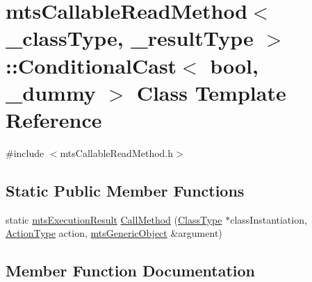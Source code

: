 \hypertarget{classmts_callable_read_method_1_1_conditional_cast}{}\section{mts\+Callable\+Read\+Method$<$ \+\_\+class\+Type, \+\_\+result\+Type $>$\+:\+:Conditional\+Cast$<$ bool, \+\_\+dummy $>$ Class Template Reference}
\label{classmts_callable_read_method_1_1_conditional_cast}


{\ttfamily \#include $<$mts\+Callable\+Read\+Method.\+h$>$}

\subsection*{Static Public Member Functions}
\begin{DoxyCompactItemize}
\item 
static \hyperlink{classmts_execution_result}{mts\+Execution\+Result} \hyperlink{classmts_callable_read_method_1_1_conditional_cast_aeb1f85e7fc92ca13e6c54c5d16d96399}{Call\+Method} (\hyperlink{classmts_callable_read_method_a44650138085a29d60a4f3cb3616abbbf}{Class\+Type} $\ast$class\+Instantiation, \hyperlink{classmts_callable_read_method_a9e05546d6f486e77f1df0c2b079dd7e1}{Action\+Type} action, \hyperlink{classmts_generic_object}{mts\+Generic\+Object} \&argument)
\end{DoxyCompactItemize}


\subsection{Member Function Documentation}
\hypertarget{classmts_callable_read_method_1_1_conditional_cast_aeb1f85e7fc92ca13e6c54c5d16d96399}{}
